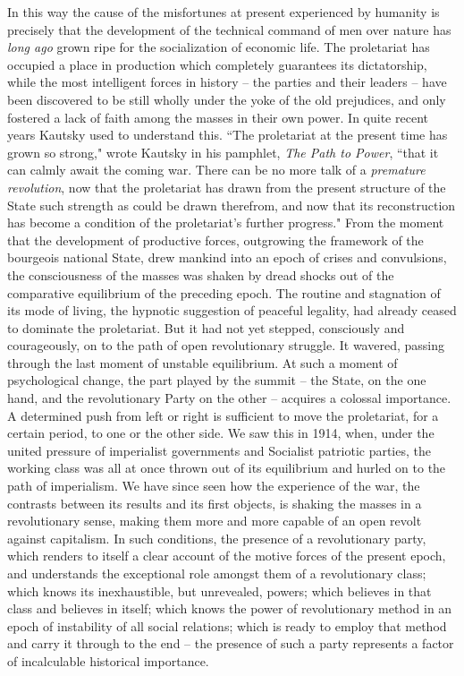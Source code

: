 \documentclass[12pt]{article}
\begin{document}
\vspace{12pt}
In this way the cause of the misfortunes at present experienced by
humanity is precisely that the development of the technical command of
men over nature has \emph{long ago} grown ripe for the socialization
of economic life. The proletariat has occupied a place in production
which completely guarantees its dictatorship, while the most
intelligent forces in history -- the parties and their leaders -- have
been discovered to be still wholly under the yoke of the old
prejudices, and only fostered a lack of faith among the masses in
their own power. In quite recent years Kautsky used to understand
this. ``The proletariat at the present time has grown so strong," wrote
Kautsky in his pamphlet, \emph{The Path to Power}, ``that it can calmly
await the coming war. There can be no more talk of a \emph{premature
revolution}, now that the proletariat has drawn from the present
structure of the State such strength as could be drawn therefrom, and
now that its reconstruction has become a condition of the
proletariat's further progress." From the moment that the development
of productive forces, outgrowing the framework of the bourgeois
national State, drew mankind into an epoch of crises and convulsions,
the consciousness of the masses was shaken by dread shocks out of the
comparative equilibrium of the preceding epoch. The routine and
stagnation of its mode of living, the hypnotic suggestion of peaceful
legality, had already ceased to dominate the proletariat. But it had
not yet stepped, consciously and courageously, on to the path of open
revolutionary struggle. It wavered, passing through the last moment of
unstable equilibrium. At such a moment of psychological change, the
part played by the summit -- the State, on the one hand, and the
revolutionary Party on the other -- acquires a colossal importance. A
determined push from left or right is sufficient to move the
proletariat, for a certain period, to one or the other side. We saw
this in 1914, when, under the united pressure of imperialist
governments and Socialist patriotic parties, the working class was all
at once thrown out of its equilibrium and hurled on to the path of
imperialism. We have since seen how the experience of the war, the
contrasts between its results and its first objects, is shaking the
masses in a revolutionary sense, making them more and more capable of
an open revolt against capitalism. In such conditions, the presence of
a revolutionary party, which renders to itself a clear account of the
motive forces of the present epoch, and understands the exceptional
role amongst them of a revolutionary class; which knows its
inexhaustible, but unrevealed, powers; which believes in that class
and believes in itself; which knows the power of revolutionary method
in an epoch of instability of all social relations; which is ready to
employ that method and carry it through to the end -- the presence of
such a party represents a factor of incalculable historical
importance.
\end{document}
